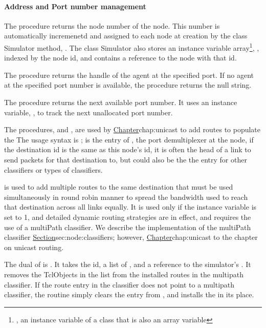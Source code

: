{\paragraph{Address and Port number management}
The procedure  returns the node number of the node.
This number is automatically incremenetd and assigned to each node at
creation by the class Simulator method, .
The class Simulator also stores an instance variable array\footnote{%
  \ie, an instance variable of a class that is also an array variable},
  , indexed by the node id, and contains a reference to the
  node with that id.

The procedure  returns the handle of the
agent at the specified port.
If no agent at the specified port number is available, the procedure returns
the null string.

The procedure  returns the next available port number.
It uses an instance variable, ,
to track the next unallocated port number.

The procedures,  and ,
are used by \href{unicast routing}{Chapter}{chap:unicast}
to add routes to populate the 
The usage syntax is
;
 is the entry of , the port demultiplexer
at the node, if the destination id is the same as this node's id,
it is often the head of a link to send packets for that destination to,
but could also be the the entry for other classifiers or types of classifiers.

is used to add multiple routes to the same destination that must be used
simultaneously in round robin manner to spread the bandwidth used to reach
that destination across all links equally.
It is used only if the instance variable  is set to 1,
and detailed dynamic routing strategies are in effect,
and requires the use of a multiPath classifier.
We describe the implementation of the multiPath classifier
\href{later in this chapter}{Section}{sec:node:classifiers};
however, \href{we defer the discussion of multipath
routing}{Chapter}{chap:unicast} to the chapter on unicast routing.

The dual of  is .
It takes the id, a list of , and a reference to
the simulator's .
It removes the TclObjects in the list from the installed routes in the
multipath classifier.
If the route entry in the classifier does not point to a multipath
classifier,
the routine simply clears the entry from , and
installs the  in its place.

}
